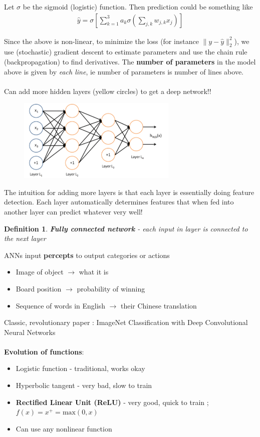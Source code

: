 \documentclass[a4paper]{article}\usepackage[]{graphicx}\usepackage[]{color}
\newtheorem{defn}{Definition}[section]
\begin{document}
Let $\sigma$ be the sigmoid (logistic) function. Then prediction could be something like
\begin{align*}
\hat{y} = \sigma \left[ \sum_{k=1}^3 a_k \sigma \left(\sum_{j,k} w_{j,k}x_j\right)\right]
\end{align*}

Since the above is non-linear, to minimize the loss (for instance $\lVert y-\hat{y}\rVert_2^2$), we use (stochastic) gradient descent to estimate parameters and use the chain rule (backpropagation) to find derivatives. The \textbf{number of parameters} in the model above is given by \emph{each line}, ie number of parameters is number of lines above.\\
\\

Can add more hidden layers (yellow circles) to get a deep network!!
\begin{figure}[H]
\centering
\includegraphics[width=3in]{nn_deep.png}
\end{figure}

The intuition for adding more layers is that each layer is essentially doing feature detection. Each layer automatically determines features that when fed into another layer can predict whatever very well!

\begin{defn}
\textbf{Fully connected network} - each input in layer is connected to the next layer
\end{defn}

ANNs input \textbf{percepts} to output categories or actions
\begin{itemize}
\item Image of object $\rightarrow$ what it is
\item Board position $\rightarrow$ probability of winning
\item Sequence of words in English $\rightarrow$ their Chinese translation
\end{itemize}

Classic, revolutionary paper : ImageNet Classification with Deep Convolutional Neural Networks \\
\\
\textbf{Evolution of functions}:
\begin{itemize}
\item Logistic function - traditional, works okay
\item Hyperbolic tangent - very bad, slow to train
\item \textbf{Rectified Linear Unit (ReLU)} - very good, quick to train ; $f(x)=x^+ = \text{max}(0,x)$
\item Can use any nonlinear function
\end{itemize}
\end{document}
